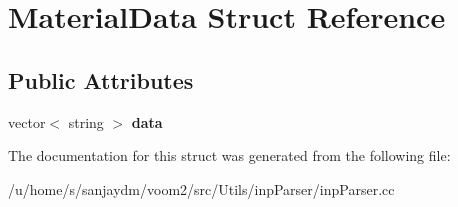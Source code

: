\hypertarget{struct_material_data}{
\section{MaterialData Struct Reference}
\label{struct_material_data}
}
\subsection*{Public Attributes}
\begin{DoxyCompactItemize}
\item 
\hypertarget{struct_material_data_ac8d0f8f8b55e2d4280770bcdfc6ee307}{
vector$<$ string $>$ {\bfseries data}}
\label{struct_material_data_ac8d0f8f8b55e2d4280770bcdfc6ee307}

\end{DoxyCompactItemize}


The documentation for this struct was generated from the following file:\begin{DoxyCompactItemize}
\item 
/u/home/s/sanjaydm/voom2/src/Utils/inpParser/inpParser.cc\end{DoxyCompactItemize}
